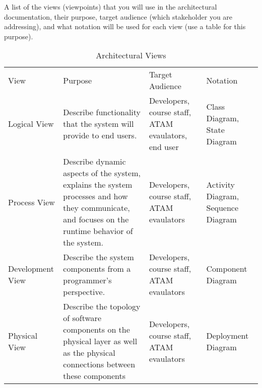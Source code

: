A list of the views (viewpoints) that you will use in the architectural
documentation, their purpose, target audience (which stakeholder you are
addressing), and what notation will be used for each view (use a table for this purpose).

\begin{table}[]
	\centering
	\caption{Architectural Views}
	\label{view_selection}
	\begin{tabularx}{\textwidth}{p{2cm}XXp{2cm}}
		View             & Purpose                                                                                                                                            & Target Audience                                     & Notation                           \\
		Logical View     & Describe functionality that the system will provide to end users.                                                                                  & Developers, course staff, ATAM evaulators, end user & Class Diagram, State Diagram       \\
		Process View     & Describe dynamic aspects of the system, explains the system processes and how they communicate, and focuses on the runtime behavior of the system. & Developers, course staff, ATAM evaulators           & Activity Diagram, Sequence Diagram \\
		Development View & Describe the system components from a programmer's perspective.                                                                                    & Developers, course staff, ATAM evaulators           & Component Diagram                  \\
		Physical View    & Describe the topology of software components on the physical layer as well as the physical connections between these components                    & Developers, course staff, ATAM evaulators           & Deployment Diagram
	\end{tabularx}
\end{table}
